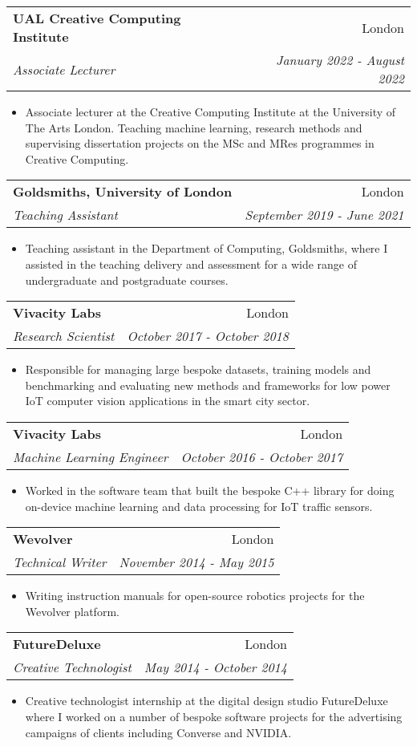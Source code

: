 \documentclass[letterpaper,11pt]{article}
\makeatletter
\newcommand{\resumeItem}[2]{
  \item\small{
    \textbf{#1}{ #2 \vspace{-2pt}}
  }
}
\newcommand{\resumeSubheading}[4]{
  \vspace{-1pt}\item
    \begin{tabular*}{0.97\textwidth}{l@{\extracolsep{\fill}}r}
      \textbf{#1} & #2 \\
      \textit{\small#3} & \textit{\small #4} \\
    \end{tabular*}\vspace{-5pt}
}
\newcommand{\resumeItemListStart}{\begin{itemize}}
\newcommand{\resumeItemListEnd}{\end{itemize}\vspace{-5pt}}
\makeatother
\begin{document}
    \resumeSubheading
      {UAL Creative Computing Institute}{London}
      {Associate Lecturer}{January 2022 - August 2022}
      \resumeItemListStart
        \resumeItem{}
          {Associate lecturer at the Creative Computing Institute at the University of The Arts London. Teaching machine learning, research methods and supervising dissertation projects on the MSc and MRes programmes in Creative Computing.}
        \resumeItemListEnd


    \resumeSubheading
      {Goldsmiths, University of London}{London}
      {Teaching Assistant}{September 2019 - June 2021}
      \resumeItemListStart
        \resumeItem{}
          {Teaching assistant in the Department of Computing, Goldsmiths, where I assisted in the teaching delivery and assessment for a wide range of undergraduate and postgraduate courses.}
    \resumeItemListEnd
    
    \resumeSubheading
      {Vivacity Labs}{London}
      {Research Scientist}{October 2017 - October 2018}
      \resumeItemListStart
        \resumeItem{}
          {Responsible for managing large bespoke datasets, training models and benchmarking and evaluating new methods and frameworks for low power IoT computer vision applications in the smart city sector. }
        \resumeItemListEnd
        
    \resumeSubheading
      {Vivacity Labs}{London}
      {Machine Learning Engineer}{October 2016 - October 2017}
      \resumeItemListStart
        \resumeItem{}
          {Worked in the software team that built the bespoke C++ library for doing on-device machine learning and data processing for IoT traffic sensors.}
        \resumeItemListEnd

      
    \resumeSubheading
      {Wevolver}{London}
      {Technical Writer}{November 2014 - May 2015}
      \resumeItemListStart
        \resumeItem{}
          {Writing instruction manuals for open-source robotics projects for the Wevolver platform. }
      \resumeItemListEnd

    \resumeSubheading
      {FutureDeluxe}{London}
      {Creative Technologist}{May 2014 - October 2014}
      \resumeItemListStart
        \resumeItem{}
          {Creative technologist internship at the digital design studio FutureDeluxe where I worked on a number of bespoke software projects for the advertising campaigns of clients including Converse and NVIDIA. }
      \resumeItemListEnd
      
\end{document}
